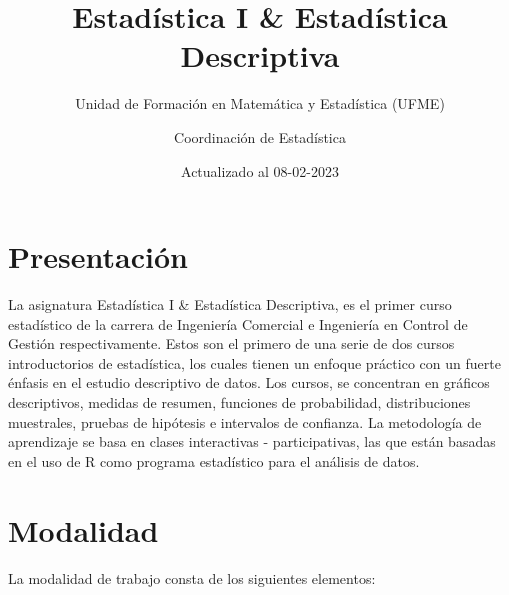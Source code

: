 \documentclass[
]{book}
\title{Estadística I \& Estadística Descriptiva}
\subtitle{Unidad de Formación en Matemática y Estadística (UFME)}
\author{Coordinación de Estadística}
\date{Actualizado al 08-02-2023}
\begin{document}
\maketitle

{
\setcounter{tocdepth}{1}
\tableofcontents
}
\hypertarget{presentaciuxf3n}{%
\chapter*{Presentación}\label{presentaciuxf3n}}

La asignatura Estadística I \& Estadística Descriptiva, es el primer curso estadístico de la carrera de Ingeniería Comercial e Ingeniería en Control de Gestión respectivamente. Estos son el primero de una serie de dos cursos introductorios de estadística, los cuales tienen un enfoque práctico con un fuerte énfasis en el estudio descriptivo de datos. Los cursos, se concentran en gráficos descriptivos, medidas de resumen, funciones de probabilidad, distribuciones muestrales, pruebas de hipótesis e intervalos de confianza. La metodología de aprendizaje se basa en clases interactivas - participativas, las que están basadas en el uso de R como programa estadístico para el análisis de datos.

\hypertarget{modalidad}{%
\chapter*{Modalidad}\label{modalidad}}

La modalidad de trabajo consta de los siguientes elementos:
\end{document}

